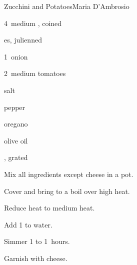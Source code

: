 \begin{recipe}{Zucchini and Potatoes}{Maria D'Ambrosio}{}

\begin{ingredients}
\item 4~medium , coined
\item {}es, julienned
\item 1~onion
\item 2~medium tomatoes
\item salt
\item pepper
\item oregano
\item olive oil
\item {}, grated
\end{ingredients}

\begin{directions}
\item Mix all ingredients except cheese in a pot.
\item Cover and bring to a boil over high heat.
\item Reduce heat to medium heat.
\item Add 1 to  water.
\item Simmer 1 to 1\half~hours.
\item Garnish with cheese.
\end{directions}

\end{recipe}
